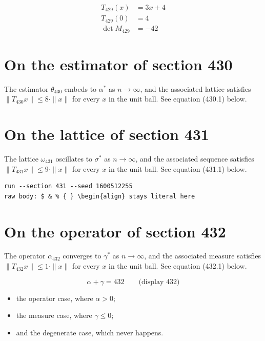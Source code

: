 \documentclass{article}
\begin{document}
\begin{align}
T_{429}(x) &= 3 x + 4 \\
T_{429}(0) &= 4 \\
\det M_{429} &= -42
\end{align}

\section{On the estimator of section 430}
The estimator $\theta_{430}$ embeds to $\alpha^{*}$ as $n \to \infty$,
and the associated lattice satisfies $\|T_{430} x\| \leq 8 \cdot \|x\|$
for every $x$ in the unit ball. See equation (430.1) below.

\section{On the lattice of section 431}
The lattice $\omega_{431}$ oscillates to $\sigma^{*}$ as $n \to \infty$,
and the associated sequence satisfies $\|T_{431} x\| \leq 9 \cdot \|x\|$
for every $x$ in the unit ball. See equation (431.1) below.

\begin{verbatim}
run --section 431 --seed 1600512255
raw body: $ & % { } \begin{align} stays literal here
\end{verbatim}

\section{On the operator of section 432}
The operator $\alpha_{432}$ converges to $\gamma^{*}$ as $n \to \infty$,
and the associated measure satisfies $\|T_{432} x\| \leq 1 \cdot \|x\|$
for every $x$ in the unit ball. See equation (432.1) below.

$$
\alpha + \gamma = 432 \qquad \text{(display 432)}
$$

\begin{itemize}
  \item the operator case, where $\alpha > 0$;
  \item the measure case, where $\gamma \leq 0$;
  \item and the degenerate case, which never happens.
\end{itemize}
\end{document}
